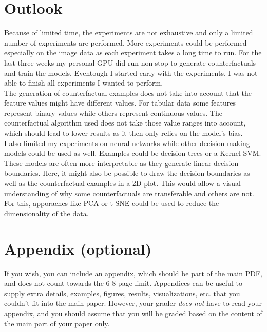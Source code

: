 \documentclass{article}
\begin{document}
\section{Outlook}
Because of limited time, the experiments are not exhaustive and only a limited number of experiments are performed. More experiments could be performed especially on the image data as each experiment takes a long time to run. For the last three weeks my personal GPU did run non stop to generate counterfactuals and train the models. Eventough I started early with the experiments, I was not able to finish all experiments I wanted to perform. \\
The generation of counterfactual examples does not take into account that the feature values might have different values. For tabular data some features represent binary values while others represent continuous values. The counterfactual algorithm used does not take those value ranges into account, which should lead to lower results as it then only relies on the model's bias. \\
I also limited my experiments on neural networks while other decision making models could be used as well. Examples could be decision trees or a Kernel SVM. These models are often more interpretable as they generate linear decision boundaries. Here, it might also be possible to draw the decision boundaries as well as the counterfactual examples in a 2D plot. This would allow a visual understanding of why some counterfactuals are transferable and others are not. For this, apporaches like PCA or t-SNE could be used to reduce the dimensionality of the data. \\




\appendix

\section{Appendix (optional)}
If you wish, you can include an appendix, which should be part of the main PDF, and does not count towards the 6-8 page limit.
Appendices can be useful to supply extra details, examples, figures, results, visualizations, etc. that you couldn't fit into the main paper. However, your grader \textit{does not} have to read your appendix, and you should assume that you will be graded based on the content of the main part of your paper only.
\end{document}
